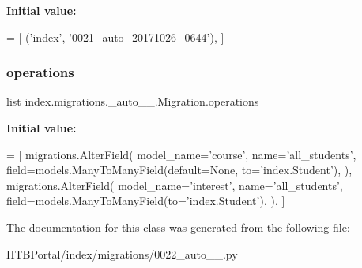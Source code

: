 {\bfseries Initial value\+:}
\begin{DoxyCode}
=  [
        (\textcolor{stringliteral}{'index'}, \textcolor{stringliteral}{'0021\_auto\_20171026\_0644'}),
    ]
\end{DoxyCode}
\mbox{\label{classindex_1_1migrations_1_10022__auto__20171026__0709_1_1Migration_a6e66320bea08678911a2e39fc8413d36}} 
\subsubsection{\texorpdfstring{operations}{operations}}
{\footnotesize\ttfamily list index.\+migrations.\+\_\+auto\+\_\+\_.\+Migration.\+operations\hspace{0.3cm}{\ttfamily [static]}}

{\bfseries Initial value\+:}
\begin{DoxyCode}
=  [
        migrations.AlterField(
            model\_name=\textcolor{stringliteral}{'course'},
            name=\textcolor{stringliteral}{'all\_students'},
            field=models.ManyToManyField(default=\textcolor{keywordtype}{None}, to=\textcolor{stringliteral}{'index.Student'}),
        ),
        migrations.AlterField(
            model\_name=\textcolor{stringliteral}{'interest'},
            name=\textcolor{stringliteral}{'all\_students'},
            field=models.ManyToManyField(to=\textcolor{stringliteral}{'index.Student'}),
        ),
    ]
\end{DoxyCode}


The documentation for this class was generated from the following file\+:\begin{DoxyCompactItemize}
\item 
I\+I\+T\+B\+Portal/index/migrations/0022\+\_\+auto\+\_\+\_.\+py\end{DoxyCompactItemize}

